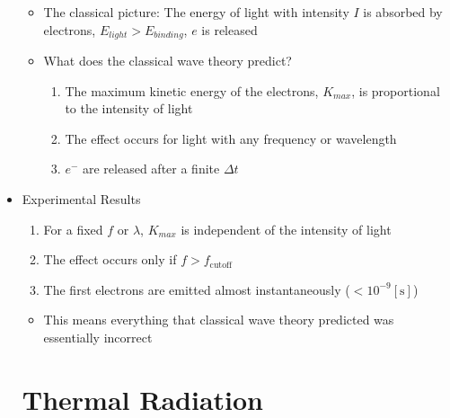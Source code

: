 \begin{itemize}
    \begin{itemize}

      \item The classical picture: The energy of light with intensity $I$ is absorbed by electrons, $E_{light} > E_{binding}$, $e$ is released


      \item What does the classical wave theory predict?

        \begin{enumerate}

          \item The maximum kinetic energy of the electrons, $K_{max}$, is proportional to the intensity of light

          \item The effect occurs for light with any frequency or wavelength

          \item $e^-$ are released after a finite $\Delta t$

        \end{enumerate}

    \end{itemize}

  \item Experimental Results

    \begin{enumerate}

      \item For a fixed $f$ or $\lambda$, $K_{max}$ is independent of the intensity of light

      \item The effect occurs only if $f>f_{\text{cutoff}}$

      \item The first electrons are emitted almost instantaneously ($<10^{-9}[\si{\second}]$)

    \end{enumerate}

    \begin{itemize}

      \item This means everything that classical wave theory predicted was essentially incorrect

    \end{itemize}

    \section{Thermal Radiation}


\end{itemize}
